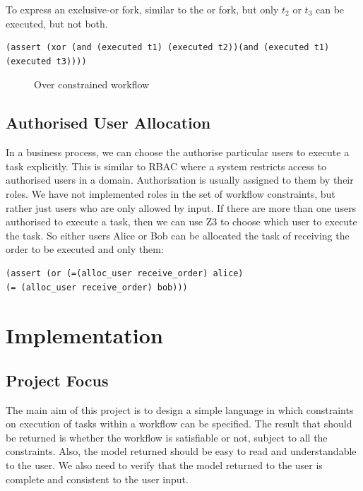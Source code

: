 \documentclass[a4paper]{report}
\begin{document}
To express an exclusive-or fork, similar to the or fork, but only $t_2$ or $t_3$ can be executed, but not both.
\begin{lstlisting}[frame=single]
(assert (xor (and (executed t1) (executed t2))(and (executed t1) (executed t3))))
\end{lstlisting}

\begin{figure}[!h]
\centering
{}
\caption{Over constrained workflow}
\label{fig:Over constrained workflow}
\end{figure}

\newpage

\section{Authorised User Allocation}
In a business process, we can choose the authorise particular users to execute a task explicitly. This is similar to RBAC\cite{rbac} where a system restricts access to authorised users in a domain. Authorisation is usually assigned to them by their roles. We have not implemented roles in the set of workflow constraints, but rather just users who are only allowed by input. If there are more than one users authorised to execute a task, then we can use Z3 to choose which user to execute the task. So either users Alice or Bob can be allocated the task of receiving the order to be executed and only them:
\begin{lstlisting}[frame=single]
(assert (or (=(alloc_user receive_order) alice) 
(= (alloc_user receive_order) bob)))
\end{lstlisting}


\chapter{Implementation}
\section{Project Focus}
The main aim of this project is to design a simple language in which constraints on execution of tasks within a workflow can be specified. The result that should be returned is whether the workflow is satisfiable or not, subject to all the constraints. Also, the model returned should be easy to read and understandable to the user. We also need to verify that the model returned to the user is complete and consistent to the user input.\\
\end{document}
